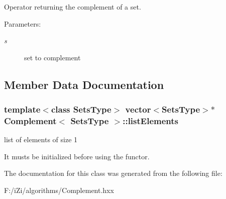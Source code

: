 Operator returning the complement of a set. 

\begin{Desc}
\item[Parameters:]
\begin{description}
\item[{\em s}]set to complement \end{description}
\end{Desc}


\subsection{Member Data Documentation}
\subsubsection{\setlength{\rightskip}{0pt plus 5cm}template$<$class Sets\-Type$>$ vector$<$Sets\-Type$>$$\ast$ {\bf Complement}$<$ Sets\-Type $>$::{\bf list\-Elements}}\label{class_complement_85fe06434f6f05ec14db39233f35e26f}


list of elements of size 1 

It musts be initialized before using the functor. 

The documentation for this class was generated from the following file:\begin{CompactItemize}
\item 
F:/i\-Zi/algorithms/Complement.hxx\end{CompactItemize}
